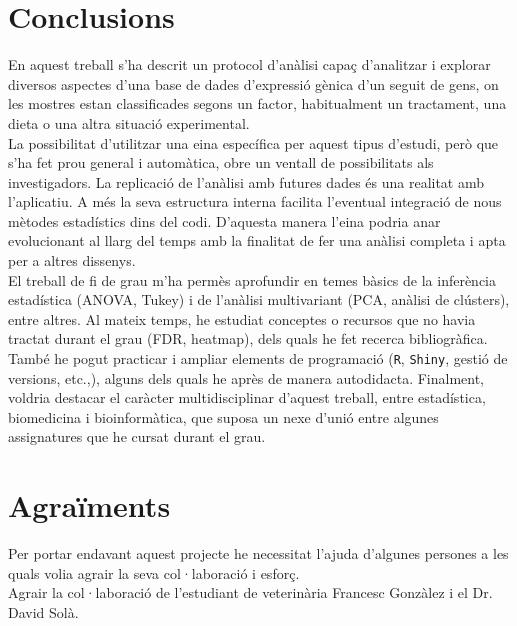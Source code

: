 \documentclass[english]{article}
\begin{document}
\section{Conclusions}
En aquest treball s'ha descrit un protocol d'anàlisi capa\c{c} d'analitzar i explorar diversos aspectes d'una base de dades d'expressió gènica d'un seguit de gens, on les mostres estan classificades segons un factor, habitualment un tractament, una dieta o una altra situació experimental.
\\

La possibilitat d'utilitzar una eina específica per aquest tipus d'estudi, però que s'ha fet prou general i automàtica, obre un ventall de possibilitats als investigadors. La replicació de l'anàlisi amb futures dades és una realitat amb l'aplicatiu. A més la seva estructura interna facilita l'eventual integració de nous mètodes estadístics dins del codi. D'aquesta manera l'eina podria anar evolucionant al llarg del temps amb la finalitat de fer una anàlisi completa i apta per a altres dissenys.
\\

El treball de fi de grau m'ha permès aprofundir en temes bàsics de la inferència estadística (ANOVA, Tukey) i de l'anàlisi multivariant (PCA, anàlisi de clústers), entre altres. Al mateix temps, he estudiat conceptes o recursos que no havia tractat durant el grau (FDR, heatmap), dels quals he fet recerca bibliogràfica. També he pogut practicar i ampliar elements de programació (\texttt{R}, \texttt{Shiny}, gestió de versions, etc.,), alguns dels quals he après de manera autodidacta. Finalment, voldria destacar el caràcter multidisciplinar d'aquest treball, entre estadística, biomedicina i bioinformàtica, que suposa un nexe d'unió entre algunes assignatures que he cursat durant el grau.
\section{Agraïments}
\label{agr}
Per portar endavant aquest projecte he necessitat l'ajuda d'algunes persones a les quals volia agrair la seva col·laboració i esfor\c{c}.\\

Agrair la col·laboració de l'estudiant de veterinària Francesc Gonzàlez i el Dr. David Solà.\\
\end{document}

